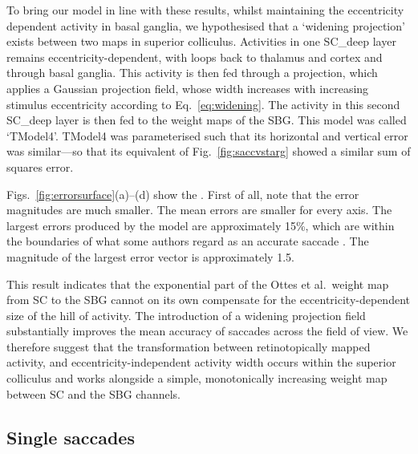 \documentclass{frontiersSCNS}
\begin{document}
To bring our model in line with these results, whilst maintaining the
eccentricity dependent activity in basal ganglia, we hypothesised that
a `widening projection' exists between two maps in superior
colliculus.   Activities in one SC\_deep layer remains
eccentricity-dependent, with loops back to thalamus and cortex and
through basal ganglia.  This activity is then fed through a
projection, which applies a Gaussian projection field, whose width
increases with increasing stimulus eccentricity according to
Eq.~\ref{eq:widening}.  The activity in this second SC\_deep layer is
then fed to the weight maps of the SBG. This model was called
`TModel4'. TModel4 was parameterised such that its horizontal and
vertical error was similar---so that its equivalent of
Fig.~\ref{fig:saccvstarg} showed a similar sum of squares error.

Figs.~\ref{fig:errorsurface}(a)--(d) show the .  First of
all, note that the error magnitudes are much smaller. The mean errors
are smaller for every axis. The largest errors produced by the model
are approximately 15\%, which are within the boundaries of what some
authors regard as an accurate
saccade \citep{mcpeek_saccade_2002,mcpeek_incomplete_2006}.  The
magnitude of the largest error vector is approximately 1.5\dg.

This result indicates that the exponential part of the Ottes et
al.~weight map from SC to the SBG cannot on its own compensate for the
eccentricity-dependent size of the hill of activity. The introduction
of a widening projection field substantially improves the mean
accuracy of saccades across the field of view.  We therefore suggest
that the transformation between retinotopically mapped activity, and
eccentricity-independent activity width occurs within the superior
colliculus and works alongside a simple, monotonically increasing
weight map between SC and the SBG channels.

\subsection{Single saccades} \label{sec:results:singlesaccades}
\end{document}

